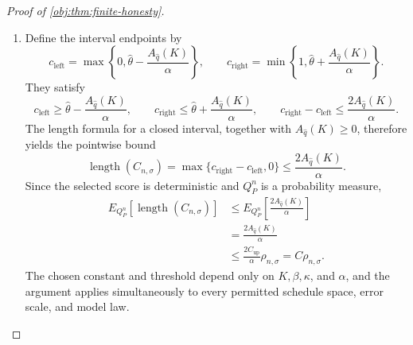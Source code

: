 \documentclass[11pt]{article}
\begin{document}
\begin{proof}[Proof of \cref{obj:thm:finite-honesty}]
\begin{enumerate}
Write
\[
L_n=\log(en),
\]
as in \cref{obj:def:frontier-rate}. If \(\sigma\le L_n^{-1/2}\), the Fourier comparison in \cref{obj:thm:observable-upper} supplies a dictionary pair whose score satisfies
\[
A_q(K)\le C_{\mathrm{up}}\rho_{n,\sigma},
\qquad q\in\mathcal D_{n,\sigma}.
\]
The minimizing property consequently gives
\[
A_{\widehat q}(K)\le A_q(K)\le C_{\mathrm{up}}\rho_{n,\sigma}.
\]
If \(L_n^{-1/2}<\sigma\), the polynomial comparison supplies a dictionary pair with
\[
A_q(K)\le C_{\mathrm{up}}\rho_{n,\sigma},
\qquad q\in\mathcal D_{n,\sigma},
\]
and again
\[
A_{\widehat q}(K)\le A_q(K)\le C_{\mathrm{up}}\rho_{n,\sigma}.
\]
These two cases exhaust the allowed error scales. Dictionary admissibility and the score formula also give
\[
A_{\widehat q}(K)\ge2\sqrt{\frac3n}>0.
\]

\item Define the interval endpoints by
\[
c_{\mathrm{left}}
=\max\!\left\{0,\widehat\theta-\frac{A_{\widehat q}(K)}{\alpha}\right\},
\qquad
c_{\mathrm{right}}
=\min\!\left\{1,\widehat\theta+\frac{A_{\widehat q}(K)}{\alpha}\right\}.
\]
They satisfy
\[
c_{\mathrm{left}}\ge\widehat\theta-\frac{A_{\widehat q}(K)}{\alpha},
\qquad
c_{\mathrm{right}}\le\widehat\theta+\frac{A_{\widehat q}(K)}{\alpha},
\qquad
c_{\mathrm{right}}-c_{\mathrm{left}}\le\frac{2A_{\widehat q}(K)}{\alpha}.
\]
The length formula for a closed interval, together with
\(A_{\widehat q}(K)\ge0\), therefore yields the pointwise bound
\[
\operatorname{length}(C_{n,\sigma})
=\max\{c_{\mathrm{right}}-c_{\mathrm{left}},0\}
\le\frac{2A_{\widehat q}(K)}{\alpha}.
\]
Since the selected score is deterministic and \(Q_P^n\) is a probability measure,
\[
\begin{aligned}
E_{Q_P^n}\!\left[\operatorname{length}(C_{n,\sigma})\right]
&\le E_{Q_P^n}\!\left[\frac{2A_{\widehat q}(K)}{\alpha}\right]\\
&=\frac{2A_{\widehat q}(K)}{\alpha}\\
&\le\frac{2C_{\mathrm{up}}}{\alpha}\rho_{n,\sigma}
=C\rho_{n,\sigma}.
\end{aligned}
\]
The chosen constant and threshold depend only on \(K,\beta,\kappa\), and \(\alpha\), and the argument applies simultaneously to every permitted schedule space, error scale, and model law.
\end{enumerate}
\end{proof}
\end{document}
